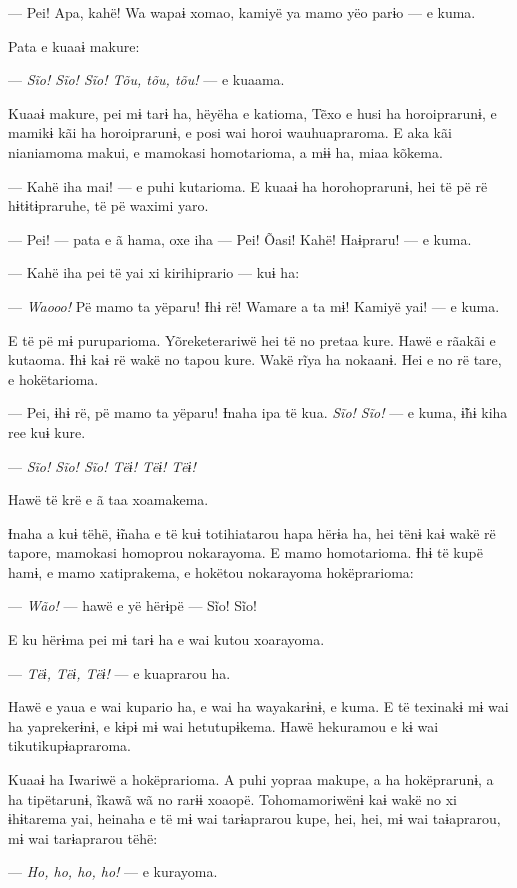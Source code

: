 --- Pei! Apa, kahë! Wa wapaɨ xomao, kamiyë ya mamo yëo parɨo --- e
kuma. 

Pata e kuaaɨ makure:

--- \textit{Sĩo! Sĩo! Sĩo! Tõu, tõu, tõu!} --- e kuaama. 

Kuaaɨ makure, pei mɨ tarɨ ha, hëyëha e katioma, Tẽxo e husi ha
horoiprarunɨ, e mamikɨ kãi ha horoiprarunɨ, e posi wai horoi
wauhuapraroma. E aka kãi nianiamoma makui, e mamokasi homotarioma, a mɨɨ
ha, miaa kõkema. 

--- Kahë iha mai! --- e puhi kutarioma. E kuaaɨ ha horohoprarunɨ, hei të
pë rë hɨtɨtɨpraruhe, të pë waximi yaro. 

--- Pei! --- pata e ã hama, oxe iha --- Pei! Õasi! Kahë! Haɨpraru! --- e
kuma. 

--- Kahë iha pei të yai xi kirihiprario --- kuɨ ha: 

--- \textit{Waooo!} Pë mamo ta yëparu! Ɨhɨ rë! Wamare a ta mɨ! Kamiyë yai! --- e
kuma. 

E të pë mɨ puruparioma. Yõreketerariwë hei të no pretaa kure. Hawë e
rãakãi e kutaoma. Ɨhɨ kaɨ rë wakë no tapou kure. Wakë rĩya ha nokaanɨ.
Hei e no rë tare, e hokëtarioma. 

--- Pei, ɨhɨ rë, pë mamo ta yëparu! Ɨnaha ipa të kua. \textit{Sĩo! Sĩo!} --- e
kuma, ɨ̃hɨ kiha ree kuɨ kure. 

--- \textit{Sĩo! Sĩo! Sĩo! Tëɨ! Tëɨ! Tëɨ!} 

Hawë të krë e ã taa xoamakema. 

Ɨnaha a kuɨ tëhë, ɨ̃naha e të kuɨ totihiatarou hapa hërɨa ha, hei tënɨ
kaɨ wakë rë tapore, mamokasi homoprou nokarayoma. E mamo homotarioma.
Ɨhɨ të kupë hamɨ, e mamo xatiprakema, e hokëtou nokarayoma hokëprarioma:

--- \textit{Wão!} --- hawë e yë hërɨpë --- Sĩo! Sĩo! 

E ku hërɨma pei mɨ tarɨ ha e wai kutou xoarayoma. 

--- \textit{Tëɨ, Tëɨ, Tëɨ!} --- e kuaprarou ha. 

Hawë e yaua e wai kupario ha, e wai ha wayakarɨnɨ, e kuma. E të texinakɨ
mɨ wai ha yaprekerɨnɨ, e kɨpɨ mɨ wai hetutupɨkema. Hawë hekuramou e kɨ
wai tikutikupɨapraroma. 

Kuaaɨ ha Iwariwë a hokëprarioma. A puhi yopraa makupe, a ha hokëprarunɨ,
a ha tipëtarunɨ, ĩkawã wã no rarɨɨ xoaopë. Tohomamoriwënɨ kaɨ wakë no xi
ɨhɨtarema yai, heinaha e të mɨ wai tarɨaprarou kupe, hei, hei, mɨ wai
taɨaprarou, mɨ wai tarɨaprarou tëhë: 

--- \textit{Ho, ho, ho, ho!} --- e kurayoma. 


